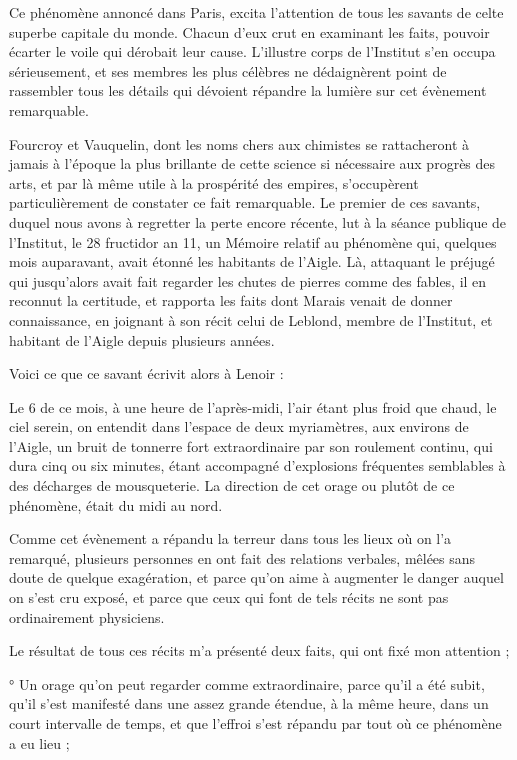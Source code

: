 \documentclass[a4paper, 12pt, oneside, french]{article}
\begin{document}
Ce phénomène annoncé dans Paris, excita l'attention de tous les savants de celte superbe capitale du monde. Chacun d'eux crut en examinant les faits, pouvoir écarter le voile qui dérobait leur cause. L'illustre corps de l'Institut s'en occupa sérieusement, et ses membres les plus célèbres ne dédaignèrent point de rassembler tous les détails qui dévoient répandre la lumière sur cet évènement remarquable.

Fourcroy et Vauquelin, dont les noms chers aux chimistes se rattacheront à jamais à l'époque la plus brillante de cette science si nécessaire aux progrès des arts, et par là même utile à la prospérité des empires, s'occupèrent particulièrement de constater ce fait remarquable. Le premier de ces savants, duquel nous avons à regretter la perte encore récente, lut à la séance publique de l'Institut, le 28 fructidor an 11, un Mémoire relatif au phénomène qui, quelques mois auparavant, avait étonné les habitants de l'Aigle. Là, attaquant le préjugé qui jusqu'alors avait fait regarder les chutes de pierres comme des fables, il en reconnut la certitude, et rapporta les faits dont Marais venait de donner connaissance, en joignant à son récit celui de Leblond, membre de l'Institut, et habitant de l'Aigle depuis plusieurs années.

Voici ce que ce savant écrivit alors à Lenoir :

\og Le 6 de ce mois, à une heure de l'après-midi, l'air étant plus froid que chaud, le ciel serein, on entendit dans l'espace de deux myriamètres, aux environs de l'Aigle, un bruit de tonnerre fort extraordinaire par son roulement continu, qui dura cinq ou six minutes, étant accompagné d'explosions fréquentes semblables à des décharges de mousqueterie. La direction de cet orage ou plutôt de ce phénomène, était du midi au nord. \fg

\og Comme cet évènement a répandu la terreur dans tous les lieux où on l'a remarqué, plusieurs personnes en ont fait des relations verbales, mêlées sans doute de quelque exagération, et parce qu'on aime à augmenter le danger auquel on s'est cru exposé, et parce que ceux qui font de tels récits ne sont pas ordinairement physiciens. \fg

\og Le résultat de tous ces récits m'a présenté deux faits, qui ont fixé mon attention ; \fg

° Un orage qu'on peut regarder comme extraordinaire, parce qu'il a été subit, qu'il s'est manifesté dans une assez grande étendue, à la même heure, dans un court intervalle de temps, et que l'effroi s'est répandu par tout où ce phénomène a eu lieu ; \fg
\end{document}
